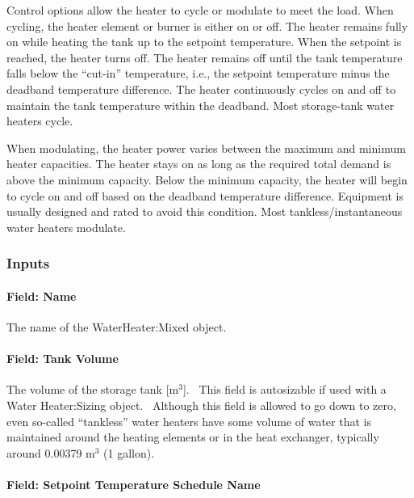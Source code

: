 Control options allow the heater to cycle or modulate to meet the load. When cycling, the heater element or burner is either on or off. The heater remains fully on while heating the tank up to the setpoint temperature. When the setpoint is reached, the heater turns off. The heater remains off until the tank temperature falls below the ``cut-in'' temperature, i.e., the setpoint temperature minus the deadband temperature difference. The heater continuously cycles on and off to maintain the tank temperature within the deadband. Most storage-tank water heaters cycle.

When modulating, the heater power varies between the maximum and minimum heater capacities. The heater stays on as long as the required total demand is above the minimum capacity. Below the minimum capacity, the heater will begin to cycle on and off based on the deadband temperature difference. Equipment is usually designed and rated to avoid this condition. Most tankless/instantaneous water heaters modulate.

\subsubsection{Inputs}\label{inputs-052}

\paragraph{Field: Name}\label{field-name-050}

The name of the WaterHeater:Mixed object.

\paragraph{Field: Tank Volume}\label{field-tank-volume-000}

The volume of the storage tank {[}m\(^{3}\){]}.~ This field is autosizable if used with a Water Heater:Sizing object.~ Although this field is allowed to go down to zero, even so-called ``tankless'' water heaters have some volume of water that is maintained around the heating elements or in the heat exchanger, typically around 0.00379 m\(^{3}\) (1 gallon).

\paragraph{Field: Setpoint Temperature Schedule Name}\label{field-setpoint-temperature-schedule-name-001}

